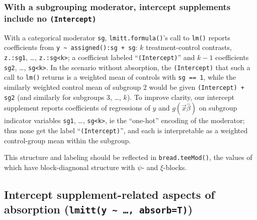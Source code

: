 \documentclass{article}
\begin{document}
\subsubsection{ With a subgrouping
  moderator, intercept supplements include no \texttt{(Intercept)}}
With a categorical moderator \texttt{sg}, \texttt{lmitt.formula()}'s call to
\texttt{lm()} reports coefficients from \texttt{y
  \textasciitilde\ assigned():sg + sg}: $k$ treatment-control contrasts,
\texttt{z.:sg1}, \ldots, \texttt{z.:sg<k>}; a
coefficient labeled ``\texttt{(Intercept)}'' and $k-1$
coefficients \texttt{sg2}, \ldots, \texttt{sg<k>}.  In the scenario
without absorption, the \texttt{(Intercept)} that such a call to \texttt{lm()}
returns is a weighted mean of
controls with \texttt{sg == 1}, while the similarly weighted control mean
of subgroup 2 would be given \texttt{(Intercept)
+ sg2} (and similarly for subgroups 3, \ldots, $k$).
To improve clarity, our intercept supplement reports coefficients of regressions of $y$ and $g(\vec{x}\hat\beta)$ on subgroup indicator variables \texttt{sg1}, \ldots, \texttt{sg<k>}, ie the ``one-hot'' encoding of the moderator; thus none get the label ``\texttt{(Intercept)}'', and each is interpretable as a weighted control-group mean within the subgroup. 

This structure and labeling should be reflected in
\texttt{bread.teeMod()}, the values of which have block-diagnonal structure with $\psi$- and $\xi$-blocks. 

\subsection{Intercept supplement-related aspects of absorption  (\texttt{lmitt(y
    \textasciitilde\ \ldots, absorb=T)})}\label{sec:interc-relat-aspects}
\end{document}
